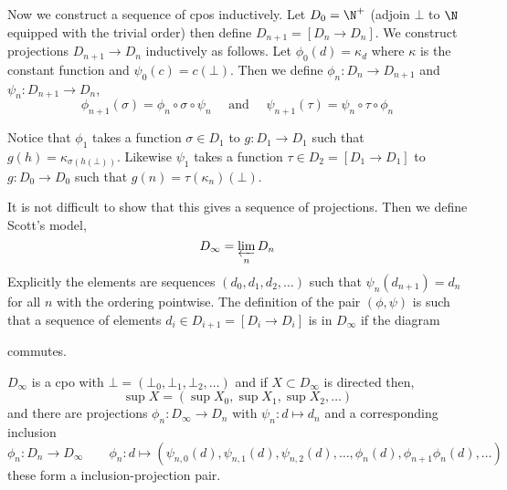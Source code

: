 \documentclass[12pt]{article}
\begin{document}
Now we construct a sequence of cpos inductively. Let $D_0 = \N^+$ (adjoin $\bot$ to $\N$ equipped with the trivial order) then define $D_{n+1} = [D_n \to D_n]$. We construct projections $D_{n+1} \to D_n$ inductively as follows. Let $\phi_0(d) = \kappa_d$ where $\kappa$ is the constant function and $\psi_0(c) = c(\bot)$. Then we define $\phi_n : D_n \to D_{n+1}$ and $\psi_n : D_{n+1} \to D_n$,
\[ \phi_{n+1}(\sigma) = \phi_{n} \circ \sigma \circ \psi_{n} \quad \text{ and } \quad \psi_{n+1}(\tau) = \psi_{n} \circ \tau \circ \phi_{n} \]

\begin{rmk}
Notice that $\phi_1$ takes a function $\sigma \in D_1$ to $g : D_1 \to D_1$ such that $g(h) = \kappa_{\sigma(h(\bot))}$. Likewise $\psi_1$ takes a function $\tau \in D_2 = [D_1 \to D_1]$ to $g : D_0 \to D_0$ such that $g(n) = \tau(\kappa_n)(\bot)$.
\end{rmk}

It is not difficult to show that this gives a sequence of projections. Then we define Scott's model,
\[ D_{\infty} = \varprojlim_{n} D_n \]
Explicitly the elements are sequences $(d_0, d_1, d_2, \dots)$ such that $\psi_n(d_{n+1}) = d_{n}$ for all $n$ with the ordering pointwise. The definition of the pair $(\phi, \psi)$ is such that a sequence of elements $d_{i} \in D_{i+1} = [D_i \to D_i]$ is in $D_\infty$ if the diagram
\begin{center}
\end{center}
commutes.

\begin{prop}
$D_\infty$ is a cpo with $\bot = (\bot_0, \bot_1, \bot_2, \dots)$ and if $X \subset D_{\infty}$ is directed then,
\[ \sup X = (\sup X_0, \sup X_1, \sup X_2, \dots) \]
and there are projections $\phi_n : D_{\infty} \to D_n$ with $\psi_n : d \mapsto d_n$ and a corresponding inclusion 
\[ 
\phi_n : D_n \to D_{\infty} \quad \quad 
\phi_n : d \mapsto (\psi_{n,0}(d), \psi_{n,1}(d), \psi_{n,2}(d), \dots, \phi_{n}(d), \phi_{n+1} \phi_n(d), \dots) 
\]
these form a inclusion-projection pair.
\end{prop}
\end{document}
